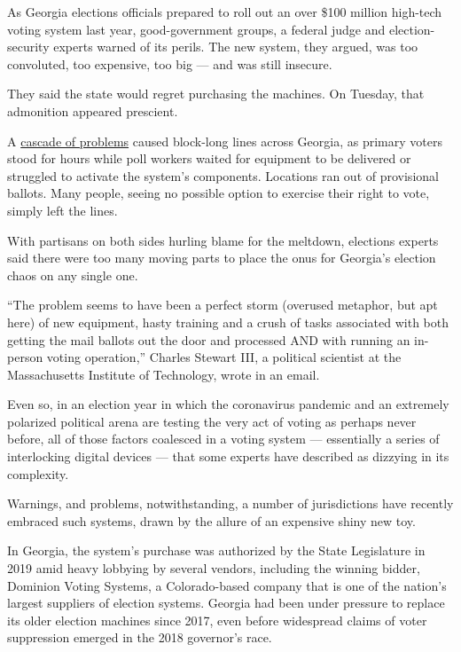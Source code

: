 As Georgia elections officials prepared to roll out an over \$100
million high-tech voting system last year, good-government groups, a
federal judge and election-security experts warned of its perils. The
new system, they argued, was too convoluted, too expensive, too big ---
and was still insecure.

They said the state would regret purchasing the machines. On Tuesday,
that admonition appeared prescient.

A
\href{https://www.nytimes3xbfgragh.onion/2020/06/10/us/politics/georgia-primary-election-voting.html}{cascade
of problems} caused block-long lines across Georgia, as primary voters
stood for hours while poll workers waited for equipment to be delivered
or struggled to activate the system's components. Locations ran out of
provisional ballots. Many people, seeing no possible option to exercise
their right to vote, simply left the lines.

With partisans on both sides hurling blame for the meltdown, elections
experts said there were too many moving parts to place the onus for
Georgia's election chaos on any single one.

``The problem seems to have been a perfect storm (overused metaphor, but
apt here) of new equipment, hasty training and a crush of tasks
associated with both getting the mail ballots out the door and processed
AND with running an in-person voting operation,'' Charles Stewart III, a
political scientist at the Massachusetts Institute of Technology, wrote
in an email.

Even so, in an election year in which the coronavirus pandemic and an
extremely polarized political arena are testing the very act of voting
as perhaps never before, all of those factors coalesced in a voting
system --- essentially a series of interlocking digital devices --- that
some experts have described as dizzying in its complexity.

Warnings, and problems, notwithstanding, a number of jurisdictions have
recently embraced such systems, drawn by the allure of an expensive
shiny new toy.

In Georgia, the system's purchase was authorized by the State
Legislature in 2019 amid heavy lobbying by several vendors, including
the winning bidder, Dominion Voting Systems, a Colorado-based company
that is one of the nation's largest suppliers of election systems.
Georgia had been under pressure to replace its older election machines
since 2017, even before widespread claims of voter suppression emerged
in the 2018 governor's race.

